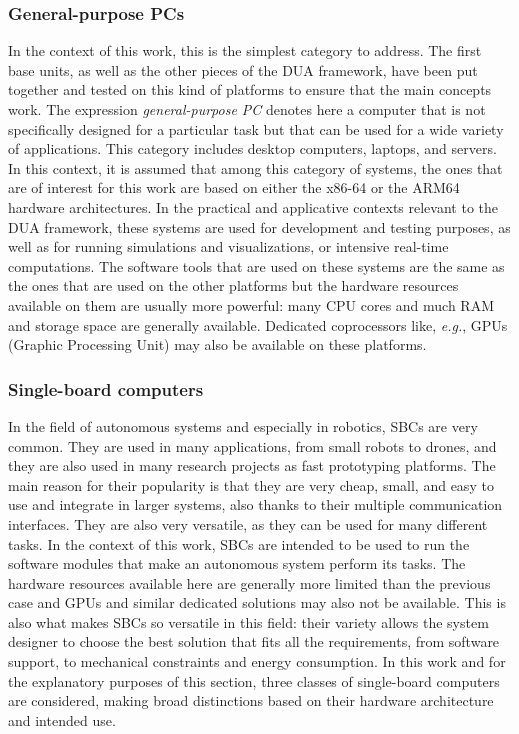 \subsubsection{General-purpose PCs}
\label{sec:dua_supported_platforms_pc}
In the context of this work, this is the simplest category to address. The first base units, as well as the other pieces of the DUA framework, have been put together and tested on this kind of platforms to ensure that the main concepts work. The expression \emph{general-purpose PC} denotes here a computer that is not specifically designed for a particular task but that can be used for a wide variety of applications. This category includes desktop computers, laptops, and servers. In this context, it is assumed that among this category of systems, the ones that are of interest for this work are based on either the x86-64 or the ARM64 hardware architectures. In the practical and applicative contexts relevant to the DUA framework, these systems are used for development and testing purposes, as well as for running simulations and visualizations, or intensive real-time computations. The software tools that are used on these systems are the same as the ones that are used on the other platforms but the hardware resources available on them are usually more powerful: many CPU cores and much RAM and storage space are generally available. Dedicated coprocessors like, \emph{e.g.}, GPUs (Graphic Processing Unit) may also be available on these platforms.

\subsubsection{Single-board computers}
\label{sec:dua_supported_platforms_sbc}
In the field of autonomous systems and especially in robotics, SBCs are very common. They are used in many applications, from small robots to drones, and they are also used in many research projects as fast prototyping platforms. The main reason for their popularity is that they are very cheap, small, and easy to use and integrate in larger systems, also thanks to their multiple communication interfaces. They are also very versatile, as they can be used for many different tasks. In the context of this work, SBCs are intended to be used to run the software modules that make an autonomous system perform its tasks. The hardware resources available here are generally more limited than the previous case and GPUs and similar dedicated solutions may also not be available. This is also what makes SBCs so versatile in this field: their variety allows the system designer to choose the best solution that fits all the requirements, from software support, to mechanical constraints and energy consumption. In this work and for the explanatory purposes of this section, three classes of single-board computers are considered, making broad distinctions based on their hardware architecture and intended use.

